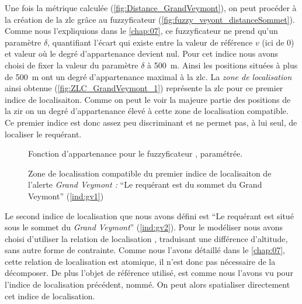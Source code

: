 Une fois la métrique calculée (\autoref{fig:Distance_GrandVeymont}),
on peut procéder à la création de la \ac{zlc} grâce au fuzzyficateur
(\autoref{fig:fuzzy_veyont_distanceSommet}). Comme nous l'expliquions
dans le \autoref{chap:07}, ce fuzzyficateur ne prend qu'un paramètre
\(\delta\), quantifiant l'écart qui existe entre la valeur de
référence \(v\) (ici de 0) et valeur où le degré d'appartenance
devient nul. Pour cet indice nous avons choisi de fixer la valeur du
paramètre \(\delta\) à \SI{500}{\meter}. Ainsi les positions situées à
plus de \SI{500}{\meter} ont un degré d'appartenance maximal à la
\ac{zlc}. La \emph{zone de localisation} ainsi obtenue
(\autoref{fig:ZLC_GrandVeymont_1}) représente la \ac{zlc} pour ce
premier indice de localisaiton. Comme on peut le voir la majeure
partie des positions de la \ac{zir} on un degré d'appartenance élevé à
cette zone de localisation compatible. Ce premier indice est donc
assez peu discriminant et ne permet pas, à lui seul, de localiser le
requérant.

\begin{figure}
  \centering
  
  \caption{Fonction d'appartenance pour le fuzzyficateur
    \protect{}, paramétrée.}
  \label{fig:fuzzy_veyont_distanceSommet}
\end{figure}

\begin{figure}
  \centering
  
  \caption{Zone de localisation compatible du premier indice de
    localisaiton de l'alerte \emph{Grand Veymont :} \enquote{Le
      requérant est \protect{}
      du sommet du Grand Veymont} (\ref{ind:gv1})}
  \label{fig:ZLC_GrandVeymont_1}
\end{figure}

Le second indice de localisation que nous avons défini est \enquote{Le
  requérant est situé sous le sommet du \emph{Grand Veymont}}
(\ref{ind:gv2}). Pour le modéliser nous avons choisi d'utiliser la
relation de localisation , traduisant une
différence d'altitude, sans autre forme de contrainte. Comme nous
l'avons détaillé dans le \autoref{chap:07}, cette relation de
localisation est atomique, il n'est donc pas nécessaire de la
décomposer. De plus l'objet de référence utilisé, est comme nous
l'avons vu pour l'indice de localisation précédent, nommé. On peut
alors spatialiser directement cet indice de localisation.

